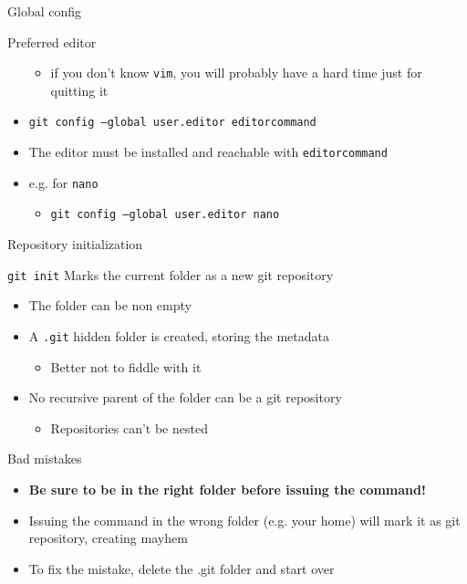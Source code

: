 \documentclass[presentation]{beamer}
\begin{document}
\begin{frame}[allowframebreaks]{Global config}
\begin{block}{Preferred editor}
\begin{itemize}
            \begin{itemize}
                \item if you don't know \texttt{vim}, you will probably have a hard time just for quitting it
            \end{itemize}
            \item \texttt{git config --global user.editor editorcommand}
            \item The editor must be installed and reachable with \texttt{editorcommand}
            \item e.g. for \texttt{nano}
            \begin{itemize}
                \item \texttt{git config --global user.editor nano}
            \end{itemize}
        \end{itemize}
    \end{block}
\end{frame}

\begin{frame}{Repository initialization}
    \begin{block}{\texttt{git init}}
        Marks the current folder as a new git repository
        \begin{itemize}
            \item The folder can be non empty
            \item A \texttt{.git} hidden folder is created, storing the metadata
            \begin{itemize}
                \item Better not to fiddle with it
            \end{itemize}
            \item No recursive parent of the folder can be a git repository
            \begin{itemize}
                \item Repositories can't be nested
            \end{itemize}
        \end{itemize}
    \end{block}
    \begin{block}{Bad mistakes}
        \begin{itemize}
            \item \textbf{Be sure to be in the right folder before issuing the command!}
            \item Issuing the command in the wrong folder (e.g. your home) will mark it as git repository, creating mayhem
            \item To fix the mistake, delete the .git folder and start over
        \end{itemize}
    \end{block}
\end{frame}
\end{document}
